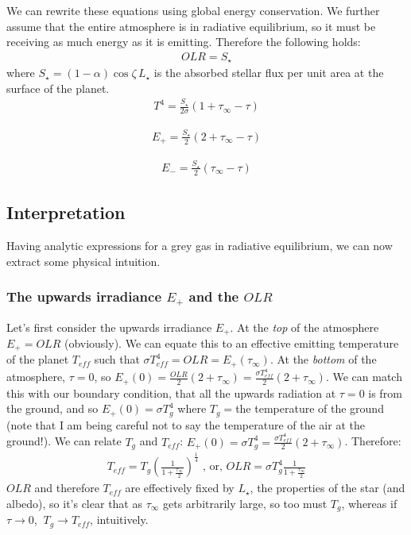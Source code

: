 We can rewrite these equations using global energy conservation. We further assume that the entire atmosphere is in radiative equilibrium, so it must be receiving as much energy as it is emitting. Therefore the following holds:
\begin{align}
    \label{OLR Radiative Equilibrium Conservation}
    OLR=S_\star
\end{align}
where $S_\star=(1-\alpha)\cos\zeta\,L_\star$ is the absorbed stellar flux per unit area at the surface of the planet.
\begin{align}
    \label{Radiative Eq T S}
    {T^4=\frac{S_\star}{2\sigma}(1+\tau_\infty-\tau)}
\end{align}

\begin{minipage}{.48\linewidth}
        \begin{gather}
            E_+=\frac{S_\star}{2}(2+\tau_\infty-\tau)
        \end{gather}
    \end{minipage}
    \hfill
    \begin{minipage}{.48\linewidth}
        \begin{gather}
            \label{Radiative Eq E- S}
            E_-=\frac{S_\star}{2}(\tau_\infty-\tau)
        \end{gather}
\end{minipage}

\subsection{Interpretation}

Having analytic expressions for a grey gas in radiative equilibrium, we can now extract some physical intuition. 

\subsubsection{The upwards irradiance $E_+$ and the $OLR$}

Let's first consider the upwards irradiance $E_+$. At the \textit{top} of the atmosphere $E_+=OLR$ (obviously). We can equate this to an effective emitting temperature of the planet $T_{eff}$ such that $\sigma T_{eff}^4=OLR=E_+(\tau_\infty)$. At the \textit{bottom} of the atmosphere, $\tau=0$, so $E_+(0)=\frac{OLR}{2}(2+\tau_\infty)=\frac{\sigma T_{eff}^4}{2}(2+\tau_\infty)$. We can match this with our boundary condition, that all the upwards radiation at $\tau=0$ is from the ground, and so $E_+(0)=\sigma T_g^4$ where $T_g=$the temperature of the ground (note that I am being careful not to say the temperature of the air at the ground!). We can relate $T_g$ and $T_{eff}$: $E_+(0)=\sigma T_{g}^4=\frac{\sigma T_{eff}^4}{2}(2+\tau_\infty)$. Therefore:
\begin{align*}
    T_{eff}=T_{g}\left(\frac{1}{1+\frac{\tau_\infty}{2}}\right)^\frac{1}{4} \,\,\text{, or,}\,\,
    OLR=\sigma T_g^4\frac{1}{1+\frac{\tau_\infty}{2}}
\end{align*}
$OLR$ and therefore $T_{eff}$ are effectively fixed by $L_\star$, the properties of the star (and albedo), so it's clear that as $\tau_\infty$ gets arbitrarily large, so too must $T_g$, whereas if $\tau\to0$, $\ T_g\to T_{eff}$, intuitively.


